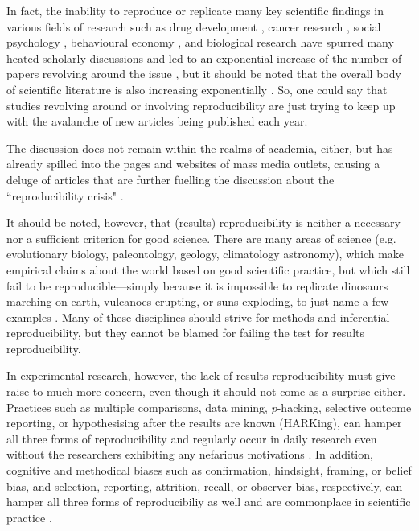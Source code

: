 \documentclass[11pt, a4paper,twoside]{report}\usepackage[]{graphicx}\usepackage[]{color}
\begin{document}
In fact, the inability to reproduce or replicate many key scientific findings in various fields of research such as drug development \citep{prinz_believe_2011,begley2012drug}, cancer research \citep{nosek_reproducibility_2017}, social psychology \citep{aarts2015estimating}, behavioural economy \citep{camerer_evaluating_2016}, and biological research \citep{freedman_economics_2015,vogt_authorization_2016} have spurred many heated scholarly discussions and led to an exponential increase of the number of papers revolving around the issue \citep{goodman_what_2016}, but it should be noted that the overall body of scientific literature is also increasing exponentially \citep{bornmann2015growth}. So, one could say that studies revolving around or involving reproducibility are just trying to keep up with the avalanche of new articles being published each year.

The discussion does not remain within the realms of academia, either, but has already spilled into the pages and websites of mass media outlets, causing a deluge of articles that are further fuelling the discussion about the ``reproducibility crisis" \citep{lehrer_truth_2010,carey_psychology_2015,carey_scrutiny_2015,achenbach_many_2015,achenbach_reproducibility_2015,yong_psychology_2016,engber_broken_2016,baker_crisis_2016,econ_try_2016,feilden_most_2017,belluz_cancer_2017,meyer_fix_2017}.

It should be noted, however, that (results) reproducibility is neither a necessary nor a sufficient criterion for good science. There are many areas of science (e.g. evolutionary biology, paleontology, geology, climatology astronomy), which make empirical claims about the world based on good scientific practice, but which still fail to be reproducible---simply because it is impossible to replicate dinosaurs marching on earth, vulcanoes erupting, or suns exploding, to just name a few examples \citep{dfg_reproduzierbarkeit_2017}. Many of these disciplines should strive for methods and inferential reproducibility, but they cannot be blamed for failing the test for results reproducibility. 

In experimental research, however, the lack of results reproducibility must give raise to much more concern, even though it should not come as a surprise either. Practices such as multiple comparisons, data mining, $p$-hacking, selective outcome reporting, or hypothesising after the results are known (HARKing), can hamper all three forms of reproducibility and regularly occur in daily research even without the researchers exhibiting any nefarious motivations \citep{goodman_what_2016}. In addition, cognitive and methodical biases such as confirmation, hindsight, framing, or belief bias, and selection, reporting, attrition, recall, or observer bias, respectively, can hamper all three forms of reproducibiliy as well and are commonplace in scientific practice \citep{munafo_manifesto_2017}.
\end{document}

